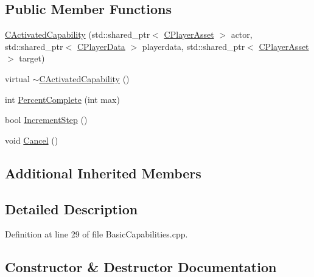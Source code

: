 \subsection*{Public Member Functions}
\begin{DoxyCompactItemize}
\item 
\hyperlink{classCPlayerCapabilityMove_1_1CActivatedCapability_a4b3a3d22ebbe673f389a6cab2b37a2fc}{C\+Activated\+Capability} (std\+::shared\+\_\+ptr$<$ \hyperlink{classCPlayerAsset}{C\+Player\+Asset} $>$ actor, std\+::shared\+\_\+ptr$<$ \hyperlink{classCPlayerData}{C\+Player\+Data} $>$ playerdata, std\+::shared\+\_\+ptr$<$ \hyperlink{classCPlayerAsset}{C\+Player\+Asset} $>$ target)
\item 
virtual \hyperlink{classCPlayerCapabilityMove_1_1CActivatedCapability_a32285a6970ff939ebafc8ab9dd84317b}{$\sim$\+C\+Activated\+Capability} ()
\item 
int \hyperlink{classCPlayerCapabilityMove_1_1CActivatedCapability_a1696dd16d89d0978284a95dd1531d0d5}{Percent\+Complete} (int max)
\item 
bool \hyperlink{classCPlayerCapabilityMove_1_1CActivatedCapability_af4670890b462f59d24195db14aeb436d}{Increment\+Step} ()
\item 
void \hyperlink{classCPlayerCapabilityMove_1_1CActivatedCapability_a6fe1e26646bd14e94ebf7abd0a41cdd3}{Cancel} ()
\end{DoxyCompactItemize}
\subsection*{Additional Inherited Members}


\subsection{Detailed Description}


Definition at line 29 of file Basic\+Capabilities.\+cpp.



\subsection{Constructor \& Destructor Documentation}
\hypertarget{classCPlayerCapabilityMove_1_1CActivatedCapability_a4b3a3d22ebbe673f389a6cab2b37a2fc}{}\label{classCPlayerCapabilityMove_1_1CActivatedCapability_a4b3a3d22ebbe673f389a6cab2b37a2fc} 
